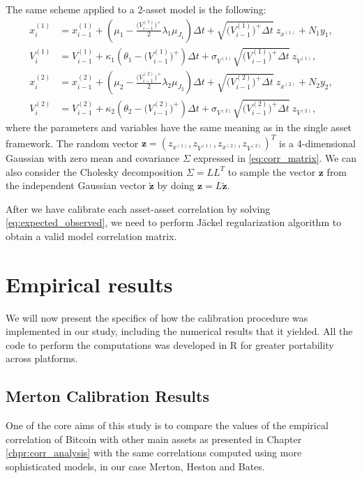 The same scheme applied to a  2-asset model is the following:
\begin{subequations}
	\label{eq:bates_full_truncation2}
	\begin{align}
	x_i^{(1)} &= x_{i-1}^{(1)} + (\mu_1 -  \frac{\Big(V_{i-1}^{(1)}\Big)^+}{2} \lambda_1\mu_{J_1})\Delta t + \sqrt{\Big(V_{i-1}^{(1)}\Big)^+ \Delta t} \:z_{x^{(1)}} + N_1 y_1, \\
	V_i^{(1)} &= V_{i-1}^{(1)} + \kappa_1(\theta_1 - \Big(V_{i-1}^{(1)}\Big)^+ )\Delta t + \sigma_{V^{(1)}} \sqrt{\Big(V_{i-1}^{(1)}\Big)^+ \Delta t} \: z_{V^(1)},\\
	x_i^{(2)} &= x_{i-1}^{(2)} + (\mu_2 -  \frac{\Big(V_{i-1}^{(2)}\Big)^+}{2} \lambda_2 \mu_{J_2})\Delta t + \sqrt{\Big(V_{i-1}^{(2)}\Big)^+\Delta t} \:z_{x^{(2)}} + N_2 y_2, \\
	V_i^{(2)} &= V_{i-1}^{(2)} + \kappa_2(\theta_2 - \Big(V_{i-1}^{(2)}\Big)^+ )\Delta t + \sigma_{V^{(2)}} \sqrt{\Big(V_{i-1}^{(2)}\Big)^+ \Delta t} \: z_{V^{(2)}},
	\end{align}
\end{subequations}
where the parameters and variables have the same meaning as in the single asset framework.
The random vector $\mathbf{z} = (z_{x^{(1)}}, z_{V^{(1)}}, z_{x^{(2)}}, z_{V^{(2)}})^T$ is a 4-dimensional Gaussian with zero mean and covariance $\Sigma$ expressed in \eqref{eq:corr_matrix}. We can also consider the Cholesky decomposition $\Sigma= L L^T$ to sample the vector $\mathbf{z}$ from the independent Gaussian vector $\mathbf{\tilde{z}}$ by doing $\mathbf{z} = L \mathbf{\tilde{z}}$.

After we have calibrate each asset-asset correlation by solving \eqref{eq:expected_observed}, we need to perform J\"ackel regularization algorithm to obtain a valid model correlation matrix.

\section{Empirical results}
We will now present the specifics of how the calibration procedure was implemented in our study, including the numerical results that it yielded.
All the code to perform the computations was developed in R for greater portability across platforms.

\subsection{Merton Calibration Results}
One of the core aims of this study is to compare the values of the empirical correlation of Bitcoin with other main assets as presented in Chapter \ref{chpr:corr_analysis} with the same correlations computed using more sophisticated models, in our case Merton, Heston and Bates.

